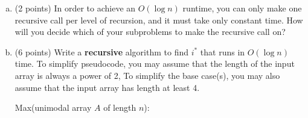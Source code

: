 \documentclass[11pt]{article}
\begin{document}
\begin{enumerate}
\begin{enumerate}[(a)]
    \item (2 points) In order to achieve an $O(\log n)$ runtime, you can only make one recursive
    call per level of recursion, and it must take only constant time. How will you decide which 
    of your subproblems to make the recursive call on?
    \vspace{2in}

    \item (6 points) Write a \textbf{recursive} algorithm to find $i^*$ that runs in $O(\log n)$ time.
    To simplify pseudocode, you may assume that the length of the input array is always a power of 2,
    To simplify the base case(s), you may also assume that the input array has length at least 4.

    \begin{algo}
    Max(unimodal array $A$ of length $n$):\+\\
    \\
    \\
    \\
    \\
    \\
    \\
    \\
    \\
    \\
    \\
    \\
    \\
    \\
    \\
    \\
    \\
    \\
    \\
    \\
    \\
    \\
    \\
    \\
    \\
    \\
    \\
    \\
    \\
    \\
    \\
    \hspace{5in}

    \end{algo}
\end{enumerate}


\newpage


\end{enumerate}
\end{document}
